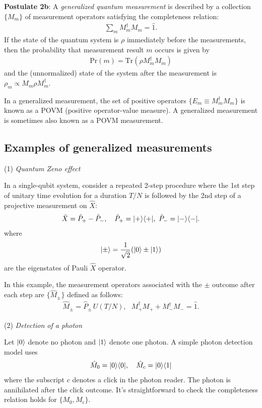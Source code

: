 \textbf{Postulate 2b}: A \emph{generalized quantum measurement} is described by a collection $\{M_m\}$ of measurement operators satisfying the completeness relation:
\begin{align}
    \sum_m M_m^\dagger M_m=\hat 1.
    \end{align}
If the state of the quantum system is $\rho$ immediately before the measurements, then the probability that measurement result $m$ occurs is given by
    \begin{align}
    \text{Pr}(m)=\text{Tr}(\rho M_m^\dagger M_m)
    \end{align}
    and the (unnormalized) state of the system after the measurement is $\rho_m\propto M_m\rho M_m^\dagger$. 

In a generalized measurement, the set of positive operators $\{E_m\equiv M_m^\dagger M_m\}$ is known as a POVM (positive operator-value measure). A generalized measurement is sometimes also known as a POVM measurement. 

\subsection{Examples of generalized measurements}

(1) \emph{Quantum Zeno effect}

In a single-qubit system, consider a repeated 2-step procedure where the 1st step of unitary time evolution
for a duration $T/N$ is followed by the 2nd step of a projective measurement on $\hat X$:
\begin{align}
    \hat X=\hat P_+-\hat P_-,~~~\hat P_+=|+\rangle\langle+|,~\hat P_-=|-\rangle\langle-|.
\end{align}
where
\begin{align}
    |{\pm}\rangle=\frac1{\sqrt{2}}(|{0}\rangle\pm|{1}\rangle)
\end{align}
are the eigenstates of Pauli $\hat X$ operator. 

In this example, the measurement operators associated with the $\pm$ outcome after
each step are $\{\hat M_\pm\}$ defined as follows:
\begin{align}
    \hat M_\pm=\hat P_\pm\,U(T/N),~~~M^\dagger_+M_++M^\dagger_-M_-=\hat1.
\end{align}


(2) \emph{Detection of a photon}

Let $|{0}\rangle$ denote no photon and $|{1}\rangle$ denote one photon.  A simple
photon detection model uses
\begin{align}
    \hat M_0=|0\rangle\langle0|,~~~\hat M_c=|{0}\rangle\langle{1}|
\end{align}
where the subscript $c$ denotes a click in the photon reader. The photon is annihilated after the click outcome. It's straightforward to check the completeness relation holds for $\{M_0,M_c\}$. 

